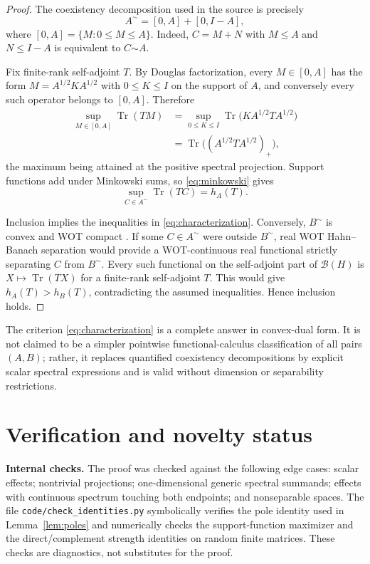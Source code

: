 \documentclass[11pt]{article}
\newcommand{\B}{\mathcal B}
\newcommand{\Tr}{\operatorname{Tr}}
\newcommand{\coex}{\mathord{\sim}}
\begin{document}
\begin{proof}
The coexistency decomposition used in the source is precisely
\begin{equation}\label{eq:minkowski}
 A^{\coex}=[0,A]+[0,I-A],
\end{equation}
where $[0,A]=\{M:0\le M\le A\}$.  Indeed, $C=M+N$ with $M\le A$ and $N\le I-A$ is equivalent to $C\coex A$.

Fix finite-rank self-adjoint $T$.  By Douglas factorization, every $M\in[0,A]$ has the form $M=A^{1/2}KA^{1/2}$ with $0\le K\le I$ on the support of $A$, and conversely every such operator belongs to $[0,A]$.  Therefore
\begin{align*}
 \sup_{M\in[0,A]}\Tr(TM)
 &=\sup_{0\le K\le I}\Tr\bigl(KA^{1/2}TA^{1/2}\bigr)\\
 &=\Tr\bigl((A^{1/2}TA^{1/2})_+\bigr),
\end{align*}
the maximum being attained at the positive spectral projection.  Support functions add under Minkowski sums, so \eqref{eq:minkowski} gives
\[
 \sup_{C\in A^{\coex}}\Tr(TC)=h_A(T).
\]

Inclusion implies the inequalities in \eqref{eq:characterization}.  Conversely, $B^{\coex}$ is convex and WOT compact \cite[Lemma~2.6]{GS}.  If some $C\in A^{\coex}$ were outside $B^{\coex}$, real WOT Hahn--Banach separation would provide a WOT-continuous real functional strictly separating $C$ from $B^{\coex}$.  Every such functional on the self-adjoint part of $\B(H)$ is $X\mapsto\Tr(TX)$ for a finite-rank self-adjoint $T$.  This would give $h_A(T)>h_B(T)$, contradicting the assumed inequalities.  Hence inclusion holds.
\end{proof}

The criterion \eqref{eq:characterization} is a complete answer in convex-dual form.  It is not claimed to be a simpler pointwise functional-calculus classification of all pairs $(A,B)$; rather, it replaces quantified coexistency decompositions by explicit scalar spectral expressions and is valid without dimension or separability restrictions.

\section{Verification and novelty status}

\textbf{Internal checks.}  The proof was checked against the following edge cases: scalar effects; nontrivial projections; one-dimensional generic spectral summands; effects with continuous spectrum touching both endpoints; and nonseparable spaces.  The file \texttt{code/check\_identities.py} symbolically verifies the pole identity used in Lemma~\ref{lem:poles} and numerically checks the support-function maximizer and the direct/complement strength identities on random finite matrices.  These checks are diagnostics, not substitutes for the proof.
\end{document}
